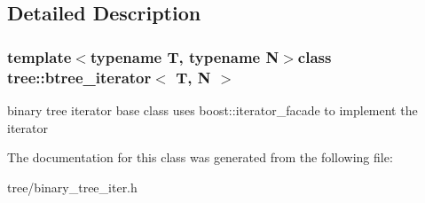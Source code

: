 \subsection{Detailed Description}
\subsubsection*{template$<$typename T, typename N$>$class tree\-::btree\-\_\-iterator$<$ T, N $>$}

binary tree iterator base class uses boost\-::iterator\-\_\-facade to implement the iterator 

The documentation for this class was generated from the following file\-:\begin{DoxyCompactItemize}
\item 
tree/binary\-\_\-tree\-\_\-iter.\-h\end{DoxyCompactItemize}
